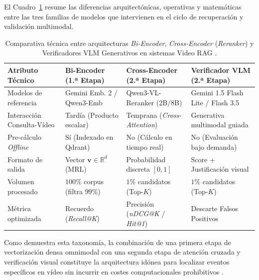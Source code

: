 El Cuadro~\ref{tab:comparativa_bi_cross_verificador} resume las diferencias arquitectónicas, operativas y matemáticas entre las tres familias de modelos que intervienen en el ciclo de recuperación y validación multimodal.

\begin{table}[htbp]
\centering
\small
\caption{Comparativa técnica entre arquitecturas \textit{Bi-Encoder}, \textit{Cross-Encoder} (\textit{Reranker}) y Verificadores VLM Generativos en sistemas Video RAG \cite{learnopencv_qwen3, qwen3_vl_emb2026, gemini_emb2_docs}.}
\label{tab:comparativa_bi_cross_verificador}
\begin{tabularx}{\linewidth}{>{\raggedright\arraybackslash}p{3.2cm}XXX}
\toprule
\textbf{Atributo Técnico} & \textbf{Bi-Encoder (1.ª Etapa)} & \textbf{Cross-Encoder (2.ª Etapa)} & \textbf{Verificador VLM (2.ª Etapa)} \\
\midrule
Modelos de referencia & Gemini Emb. 2 / Qwen3-Emb & Qwen3-VL-Reranker (2B/8B) & Gemini 1.5 Flash Lite / Flash 3.5 \\
Interacción Consulta-Vídeo & Tardía (Producto escalar) & Temprana (\textit{Cross-Attention}) & Generativa multimodal guiada \\
Pre-cálculo \textit{Offline} & Sí (Indexado en Qdrant) & No (Cálculo en tiempo real) & No (Evaluación bajo demanda) \\
Formato de salida & Vector $\mathbf{v} \in \mathbb{R}^d$ (MRL) & Probabilidad discreta $[0, 1]$ & Score + Justificación visual \\
Volumen procesado & $100\%$ corpus (filtra $99\%$) & $1\%$ candidatos (Top-$K$) & $1\%$ candidatos (Top-$K$) \\
Métrica optimizada & Recuerdo (\textit{Recall@K}) & Precisión (\textit{nDCG@K} / \textit{Hit@1}) & Descarte Falsos Positivos \\
\bottomrule
\end{tabularx}
\end{table}

Como demuestra esta taxonomía, la combinación de una primera etapa de vectorización densa omnimodal con una segunda etapa de atención cruzada y verificación visual constituye la arquitectura idónea para localizar eventos específicos en vídeo sin incurrir en costes computacionales prohibitivos \cite{learnopencv_qwen3, qwen3_vl_emb2026}.